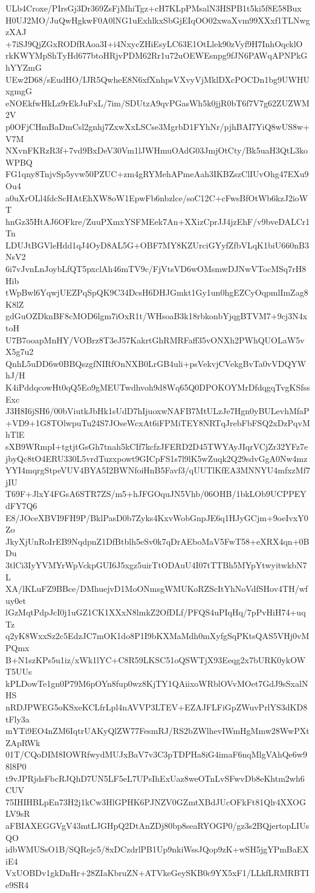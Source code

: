 ULb4Croxe/PIrsGj3Dr369ZsFjMhiTgz+cH7KLpPMsalN3HSPB1t5ki5f8E58Bux
H0UJ2MO/JuQwHgkwF0A0lNG1uExhlkxSbGjEIqOO02xwaXvm99XXxf1TLNwgzXAJ
+7iSJ9QjZGxRODfRAoa3I+i4NxycZHiEsyLC63E1OtLlek90zVyf9H7InhOqcklO
rkKWYMpShTyHd677btoHRjvPDM62Rr1u72uOEWEsnpg9fJN6PAWqAPNPkGhYYZmG
UEw2D68/sEudHO/IJR5QwheE8N6xfXnhpsVXvyVjMklDXcPOCDn1bg9UWHUxgmgG
eNOEkfwHkLz9rEkJuFxL/7im/SDUtzA9qvPGasWh5k0jjR0bT6f7V7g62ZUZWM2V
p0OFjCHmBaDmCsl2gnhj7ZxwXxLSCse3MgrbD1FYhNr/pjhBAI7YiQ8wUS8w+V7M
NXvnFKRzR3f+7vd9BxDeV30Vm1lJWHmuOAdG03JmjOtCty/Bk5uaH3QtL3koWPBQ
FG1qny8TnjvSp5yvw50PZUC+zm4gRYMehAPmeAah3IKBZszClIUvOhg47EXu9Ou4
a0uXrOLl4fdcScHAtEhXW8oW1EpwFb6nbzlce/soC12C+cFwsBfOtWb6kzJ2ioWT
hnGz35HtAJ6OFkre/ZuuPXmxYSFMEek7An+XXizCprJJ4jzEhF/v9bveDALCr1Tn
LDUJtBGVleHdd1qJ4OyD8AL5G+OBF7MY8KZUrciGYyfZfbVLqK1biU660nB3NsV2
6i7vJvnLnJoybLfQT5pxclAh46mTV9c/FjVtsVD6wOMsmwDJNwVTocMSq7rH8Hib
tWpBwl6YqwjUEZPqSpQK9C34DcsH6DHJGmkt1Gy1un0hgEZCyOqpmlImZag8K8lZ
gdGuOZDknBF8cMOD6lgm7iOxR1t/WHsoaB3k18rbkonbYjqgBTVM7+9cj3N4xtoH
U7B7ooapMnHY/VOBrz8T3eJ57KakrtGhRMRFaff35vONXh2PWhQUOLaW5vX5g7u2
QnhL5uDD6w0BBQszgfNIRfOnNXB0LrGB4uli+psVekvjCVekgBvTa0vVDQYWhJ/H
K4iPddqcowHt0qQ5Eo9gMEUTwdhvoh9d8Wq65Q0DPOKOYMrDfdqgqTvgKSfssExc
J3H8I6jSH6/00bViutkJbHk1sUdD7hIjuoxwNAFB7MtULzJe7Hgn0yBULevhMfaP
+VD9+1G8TOlwpuTu24S7JOseWcxAt6iFPMiTEY8NRTqJrebFbFSQ2xDzPqvMhTlE
sXB9WRmpI+tgtjtGsGh7tnah5kCIf7kcfzJFERD2D45TWYAyJIqrVCjZr32YFz7e
jbyQc8tO4ERU330L5vrdTuzxpowt9GICpFS1s7l9lK5wZuqk2Q29sdvGgA0Nw4mz
YYI4mqrgStpeVUV4BYA5I2BWNfoiHnB5Favf3/qUUTlKfEA3MNNYU4mfxzMf7jIU
T69F+JlxY4FGsA6STR7ZS/m5+hJFGOquJN5Vhb/06OHB/1bkLOb9UCPPEYdFY7Q6
E8/JOceXBVI9FH9P/BklPasD0b7Zyks4KxvWobGnpJE6q1HJyGCjm+9oeIvxY0Zo
JkyXjUnRoIrEB9NqdpnZ1DfBtblh5eSv0k7qDrAEboMaV5FwT58+eXRX4qn+0BDu
3tlCi3IyYVMYrWpVckpGUI6J5xgz5uirTtODAuU4I07tTTBh5MYpYtwyitwkbN7L
XA/lKLuFZ9BBce/DMhuejvD1MoONmsgWMUKoRZScItYhNoVdfSHov4TH/wfuy0et
lGzMqtPdpJcI0j1uGZ1CK1XXxN8lmkZ2OfDLf/PFQS4uPIqHq/7pPvHiH74+uqTz
q2yK8WxxSz2c5EdzJC7mOK1do8P1I9bKXMaMdh0mXyfgSqPKtsQAS5VHj0vMPQmx
B+N1szKPs5u1iz/xWk1lYC+C8R59LKSC51oQSWTjX93Eeqg2x7bURK0ykOWT5UUs
kPLDowTe1gn0P79M6pOYn8fup0wz8KjTY1QAiixoWRblOVvMOet7GdJ9sSxalNHS
nRDJPWEG5oKSxeKCLfrLpl4nAVVP3LTEV+EZAJFLFiGpZWuvPrlYS3dKD8tFly3a
mYTi9EO4nZM6IqtrUAKyQlZW77FesmRJ/RS2bZWlhevIWmHgMmw28WwPXtZApRWk
01T/CQoDIM8IOWRfwydMUJxBaV7v3C3pTDPHa8iG4imaF6nqMlgVAhQe6w98l8P0
t9vJPRjdsFbcRJQhD7UN5LF5eL7UPsIhExUaz8weOTnLvSFwvDb8eKhtm2wh6CUV
75IHIHBLpEn73H2j1kCw3HlGPHK6PJNZV0GZmtXBdJUcOFkFt81Qlr4XXOGLV9sR
aFBIAXEGGVgV43mtLJGHpQ2DtAnZDj80bp8seaRYOGP0/gz3s2BQjertopLIUsQO
idbWMUSsO1B/SQRejc5/8xDCzdrlPB1Up9nkiWssJQop9zK+wSH5jgYPmBaEXiE4
VxUOBDv1gkDnHr+28ZIaKbruZN+ATVkeGeySKB0c9YX5xF1/LLkfLRMRBTIe9SR4
